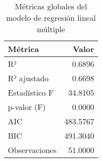 \begin{table}[H]
    \centering
    \color{blue}
    \caption{Métricas globales del modelo de regresión lineal múltiple}
    \label{tab:metricas_regresion}
    \begin{tabular}{lr}
        \toprule
            Métrica & Valor \\
        \midrule
            R² & 0.6896 \\
            R² ajustado & 0.6698 \\
            Estadístico F & 34.8105 \\
            p-valor (F) & 0.0000 \\
            AIC & 483.5767 \\
            BIC & 491.3040 \\
            Observaciones & 51.0000 \\
        \bottomrule
    \end{tabular}
\end{table}

